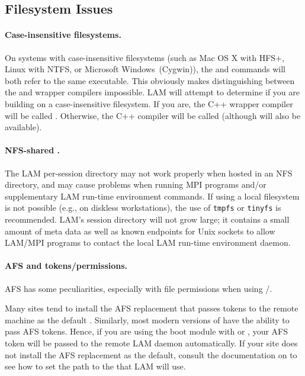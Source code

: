 \subsection{Filesystem Issues}

\paragraph{Case-insensitive filesystems.}

On systems with case-insensitive filesystems (such as Mac OS X with
HFS+, Linux with NTFS, or Microsoft Windows\trademark\ (Cygwin)), the 
 and  commands will both refer to the same executable.  
This obviously makes distinguishing between the  and  
wrapper compilers impossible.  LAM will attempt to determine if you are
building on a case-insensitive filesystem.  If you are, the C++
wrapper compiler will be called .  Otherwise, the C++
compiler will be called  (although  will also
be available).
  
\paragraph{NFS-shared .}

The LAM per-session directory may not work properly when hosted in an
NFS directory, and may cause problems when running MPI programs and/or
supplementary LAM run-time environment commands.  If using a local
filesystem is not possible (e.g., on diskless workstations), the use
of {\tt tmpfs} or {\tt tinyfs} is recommended.  LAM's session
directory will not grow large; it contains a small amount of meta data
as well as known endpoints for Unix sockets to allow LAM/MPI programs
to contact the local LAM run-time environment daemon.

\paragraph{AFS and tokens/permissions.}

AFS has some peculiarities, especially with file permissions when
using /.  

Many sites tend to install the AFS  replacement that passes
tokens to the remote machine as the default .  Similarly,
most modern versions of  have the ability to pass AFS tokens.
Hence, if you are using the  boot module with  or
, your AFS token will be passed to the remote LAM daemon
automatically.  If your site does not install the AFS replacement
 as the default, consult the documentation on
 to see how to set the path to the  that
LAM will use.

